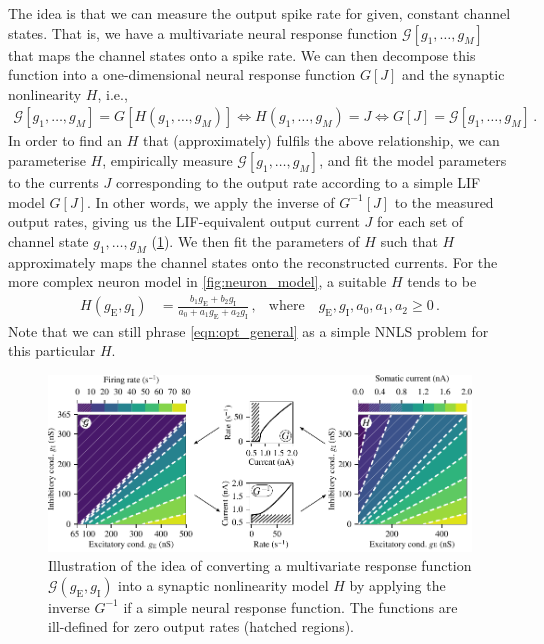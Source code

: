 \documentclass[10pt,letterpaper,oneside]{article}
\begin{document}
The idea is that we can measure the output spike rate for given, constant channel states. That is, we have a multivariate neural response function $\mathcal{G}[g_1, \ldots, g_M]$ that maps the channel states onto a spike rate. We can then decompose this function into a one-dimensional neural response function $G[J]$ and the synaptic nonlinearity $H$, i.e.,
\begin{align*}
	\mathcal{G}[g_1, \ldots, g_M] = G[H(g_1, \ldots, g_M)] \Leftrightarrow H(g_1, \ldots, g_M) = J \Leftrightarrow G[J] = \mathcal{G}[g_1, \ldots, g_M] \,.
\end{align*}
In order to find an $H$ that (approximately) fulfils the above relationship, we can parameterise $H$, empirically measure $\mathcal{G}[g_1, \ldots, g_M]$, and fit the model parameters to the currents $J$ corresponding to the output rate according to a simple LIF model $G[J]$. In other words, we apply the inverse of $G^{-1}[J]$ to the measured output rates, giving us the LIF-equivalent output current $J$ for each set of channel state $g_1, \ldots, g_M$ (\cref{fig:two_compartment_response_curve}). We then fit the parameters of $H$ such that $H$ approximately maps the channel states onto the reconstructed currents. For the more complex neuron model in \cref{fig:neuron_model}, a suitable $H$ tends to be
\begin{align}
	H(g_\mathrm{E}, g_\mathrm{I}) &= \frac{b_1 g_\mathrm{E} + b_2 g_\mathrm{I}}{a_0 + a_1 g_\mathrm{E} + a_2 g_\mathrm{I}} \,, & \text{where} \quad g_\mathrm{E}, g_\mathrm{I}, a_0, a_1, a_2 \geq 0 \,.
	\label{eqn:model_H}
\end{align}
Note that we can still phrase \cref{eqn:opt_general} as a simple NNLS problem for this particular $H$.

\begin{figure}
	\centering
	\includegraphics{media/two_compartment_response_curve.pdf}
	\caption{Illustration of the idea of converting a multivariate response function $\mathcal{G}(g_\mathrm{E}, g_\mathrm{I})$ into a synaptic nonlinearity model $H$ by applying the inverse $G^{-1}$ if a simple neural response function. The functions are ill-defined for zero output rates (hatched regions).}
	\label{fig:two_compartment_response_curve}
\end{figure}
\end{document}
